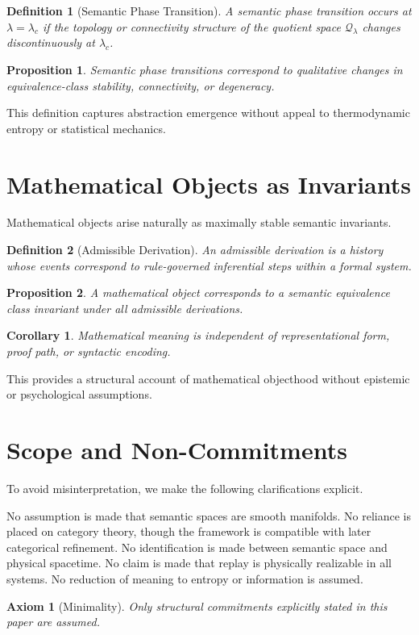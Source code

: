 \documentclass[11pt]{article}
\newtheorem{definition}{Definition}[section]
\newtheorem{axiom}{Axiom}[section]
\newtheorem{proposition}{Proposition}[section]
\newtheorem{corollary}{Corollary}[section]
\begin{document}
\begin{definition}[Semantic Phase Transition]
A semantic phase transition occurs at $\lambda = \lambda_c$ if the topology or connectivity structure of the quotient space $\mathcal{Q}_\lambda$ changes discontinuously at $\lambda_c$.
\end{definition}

\begin{proposition}
Semantic phase transitions correspond to qualitative changes in equivalence-class stability, connectivity, or degeneracy.
\end{proposition}

This definition captures abstraction emergence without appeal to thermodynamic entropy or statistical mechanics.

\section{Mathematical Objects as Invariants}

Mathematical objects arise naturally as maximally stable semantic invariants.

\begin{definition}[Admissible Derivation]
An admissible derivation is a history whose events correspond to rule-governed inferential steps within a formal system.
\end{definition}

\begin{proposition}
A mathematical object corresponds to a semantic equivalence class invariant under all admissible derivations.
\end{proposition}

\begin{corollary}
Mathematical meaning is independent of representational form, proof path, or syntactic encoding.
\end{corollary}

This provides a structural account of mathematical objecthood without epistemic or psychological assumptions.

\section{Scope and Non-Commitments}

To avoid misinterpretation, we make the following clarifications explicit.

No assumption is made that semantic spaces are smooth manifolds. No reliance is placed on category theory, though the framework is compatible with later categorical refinement. No identification is made between semantic space and physical spacetime. No claim is made that replay is physically realizable in all systems. No reduction of meaning to entropy or information is assumed.

\begin{axiom}[Minimality]
Only structural commitments explicitly stated in this paper are assumed.
\end{axiom}
\end{document}
